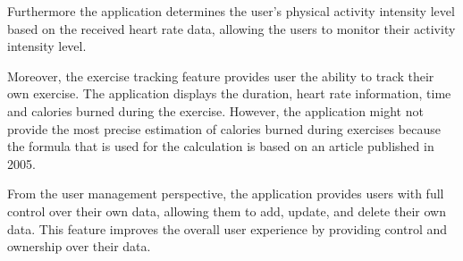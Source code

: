 Furthermore the application determines the user's physical activity intensity level based on the received heart rate data, allowing the users to monitor their activity intensity level.

Moreover, the exercise tracking feature provides user the ability to track their own exercise. The application displays the duration, heart rate information, time and calories burned during the exercise.
However, the application might not provide the most precise estimation of calories burned during exercises because the formula that is used for the calculation is based on an article published in 2005\autocite{keytel2005energy}.     

From the user management perspective, the application provides users with full control over their own data, allowing them to add, update, and delete their own data.
This feature improves the overall user experience by providing control and ownership over their data.

